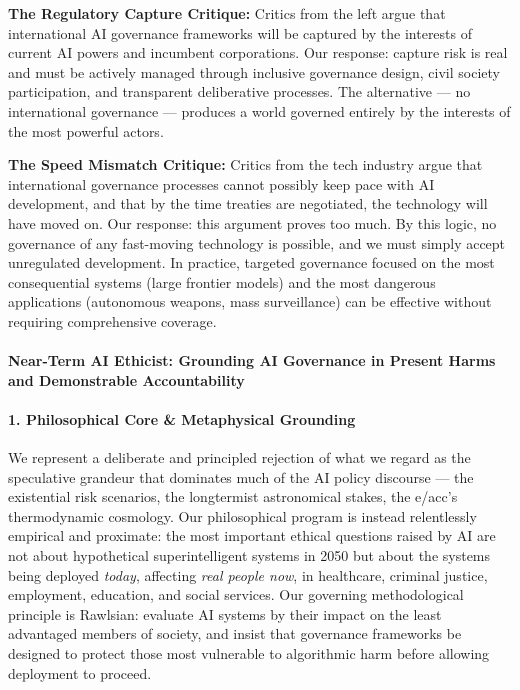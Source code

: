 \textbf{The Regulatory Capture Critique:} Critics from the left argue
that international AI governance frameworks will be captured by the
interests of current AI powers and incumbent corporations. Our response:
capture risk is real and must be actively managed through inclusive
governance design, civil society participation, and transparent
deliberative processes. The alternative --- no international governance
--- produces a world governed entirely by the interests of the most
powerful actors.

\textbf{The Speed Mismatch Critique:} Critics from the tech industry
argue that international governance processes cannot possibly keep pace
with AI development, and that by the time treaties are negotiated, the
technology will have moved on. Our response: this argument proves too
much. By this logic, no governance of any fast-moving technology is
possible, and we must simply accept unregulated development. In
practice, targeted governance focused on the most consequential systems
(large frontier models) and the most dangerous applications (autonomous
weapons, mass surveillance) can be effective without requiring
comprehensive coverage.

\paragraph{Near-Term AI Ethicist: Grounding AI Governance in Present
Harms and Demonstrable
Accountability}\label{near-term-ai-ethicist-grounding-ai-governance-in-present-harms-and-demonstrable-accountability}

\paragraph{1. Philosophical Core \& Metaphysical
Grounding}\label{philosophical-core-metaphysical-grounding-5}

We represent a deliberate and principled rejection of what we regard as
the speculative grandeur that dominates much of the AI policy discourse
--- the existential risk scenarios, the longtermist astronomical stakes,
the e/acc's thermodynamic cosmology. Our philosophical program is
instead relentlessly empirical and proximate: the most important ethical
questions raised by AI are not about hypothetical superintelligent
systems in 2050 but about the systems being deployed \emph{today},
affecting \emph{real people now}, in healthcare, criminal justice,
employment, education, and social services. Our governing methodological
principle is Rawlsian: evaluate AI systems by their impact on the least
advantaged members of society, and insist that governance frameworks be
designed to protect those most vulnerable to algorithmic harm before
allowing deployment to proceed.


